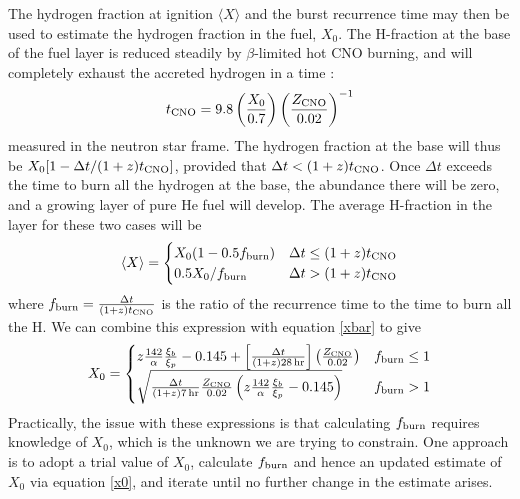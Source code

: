 \documentclass{aastex61}
\begin{document}
The hydrogen fraction at ignition $\langle X\rangle$ and the burst recurrence time may then be used to estimate the hydrogen fraction in the fuel, $X_0$. The H-fraction at the base of the fuel layer is reduced steadily by $\beta$-limited hot CNO burning, and will completely exhaust the accreted hydrogen in a time \cite[]{lampe16}:
\begin{equation}
t_{\rm CNO} =9.8\left(\frac{X_0}{0.7}\right) \left(\frac{Z_{\rm CNO}}{0.02}\right)^{-1}
\end{equation}
measured in the neutron star frame.
The hydrogen fraction at the base will thus be $X_0[1-\Delta t/(1+z)t_{\rm CNO}]$, 
%
provided that $\Delta t < (1+z)t_{\rm CNO}$. Once $\Delta t$ exceeds the time to burn all the hydrogen at the base, the abundance there will be zero, and a growing layer of pure He fuel will develop. The average H-fraction in the layer for these two cases will be 
\begin{equation}
\langle X \rangle = \begin{cases}
  X_0(1-0.5f_{\rm burn}) & \Delta t \leq (1+z)t_{\rm CNO} \\
  0.5X_0/f_{\rm burn} & \Delta t > (1+z)t_{\rm CNO}
  \end{cases}
\end{equation}
where $f_{\rm burn} = \frac{\Delta t}{(1+z)t_{\rm CNO}}$ is the ratio of the recurrence time to the time to burn all the H.
%
We can combine this expression with equation \ref{xbar} to give
\begin{equation}
X_0 = \begin{cases}
         z\frac{142}{\alpha}\frac{\xi_b}{\xi_p} - 0.145 
                           +\left[\frac{\Delta t}{(1+z)28\,{\rm hr}}\right]
                       \left(\frac{Z_{\rm CNO}}{0.02}\right) & f_{\rm burn} \leq 1\\
         \sqrt{ \frac{\Delta t}{(1+z)7\,{\rm hr}}\frac{Z_{\rm CNO}}{0.02}
                        \left(z\frac{142}{\alpha}\frac{\xi_b}{\xi_p} - 0.145\right) }
                        & f_{\rm burn} > 1
        \end{cases}
\end{equation}
Practically, the issue with these expressions is that calculating $f_{\rm burn}$ requires knowledge of $X_0$, which is the unknown we are trying to constrain. One approach is to adopt a trial value of $X_0$, calculate $f_{\rm burn}$ and hence an updated estimate of $X_0$ via equation \ref{x0}, and iterate until no further change in the estimate arises.
\end{document}
